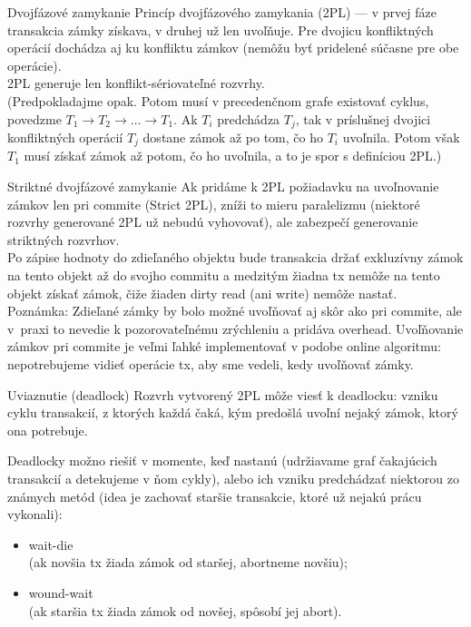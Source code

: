 \documentclass[12pt]{beamer}
\def\blue#1{\textcolor{Cerulean}{#1}}
\begin{document}
\begin{frame}[fragile]{Dvojfázové zamykanie}
Princíp dvojfázového zamykania (2PL) --- v prvej fáze transakcia zámky získava,
v druhej už len uvoľňuje. Pre dvojicu konfliktných operácií dochádza aj ku konfliktu zámkov
(nemôžu byť pridelené súčasne pre obe operácie).\\[2mm]

\blue{2PL generuje len konflikt-sériovateľné rozvrhy.}\\[2mm]

(Predpokladajme opak. Potom musí v precedenčnom grafe existovať cyklus,
povedzme $T_1 \rightarrow T_2 \rightarrow \dots \rightarrow T_1$.
Ak $T_i$ predchádza $T_j$, tak v príslušnej dvojici konfliktných operácií $T_j$ dostane zámok až po tom,
čo ho $T_i$ uvoľnila.
Potom však $T_1$ musí získať zámok až potom, čo ho uvoľnila, a to je spor s definíciou 2PL.)
\end{frame}


\begin{frame}[fragile]{Striktné dvojfázové zamykanie}
Ak pridáme k 2PL požiadavku na uvoľnovanie zámkov len pri commite (Strict 2PL), zníži to mieru paralelizmu
(niektoré rozvrhy generované 2PL už nebudú vyhovovať), ale zabezpečí generovanie striktných rozvrhov.\\[2mm]

Po zápise hodnoty do zdieľaného objektu bude transakcia držať exkluzívny zámok na tento objekt až do svojho commitu
a medzitým žiadna tx nemôže na tento objekt získať zámok, čiže žiaden dirty read (ani write) nemôže nastať.\\[2mm]

\scriptsize{Poznámka: Zdieľané zámky by bolo možné uvoľňovať aj skôr ako pri commite,
ale v~praxi to nevedie k pozorovateľnému zrýchleniu a pridáva overhead.
Uvoľňovanie zámkov pri commite je veľmi ľahké implementovať v podobe online algoritmu:
nepotrebujeme vidieť  operácie tx, aby sme vedeli, kedy uvoľňovať zámky.}
\end{frame}

\begin{frame}[fragile]{Uviaznutie (deadlock)}
Rozvrh vytvorený 2PL môže viesť k \alert{deadlocku}:
vzniku cyklu transakcií, z ktorých každá čaká, kým predošlá uvoľní nejaký zámok, ktorý ona potrebuje.

Deadlocky možno riešiť v momente, keď nastanú (udržiavame graf čakajúcich transakcií a detekujeme v ňom cykly),
alebo ich vzniku predchádzať niektorou zo známych metód
(idea je zachovať staršie transakcie, ktoré už nejakú prácu vykonali):
\begin{itemize}
\item \blue{wait-die}\\ (ak novšia tx žiada zámok od staršej, abortneme novšiu);
\item \blue{wound-wait}\\ (ak staršia tx žiada zámok od novšej, spôsobí jej abort).
\end{itemize}
\end{frame}
\end{document}
